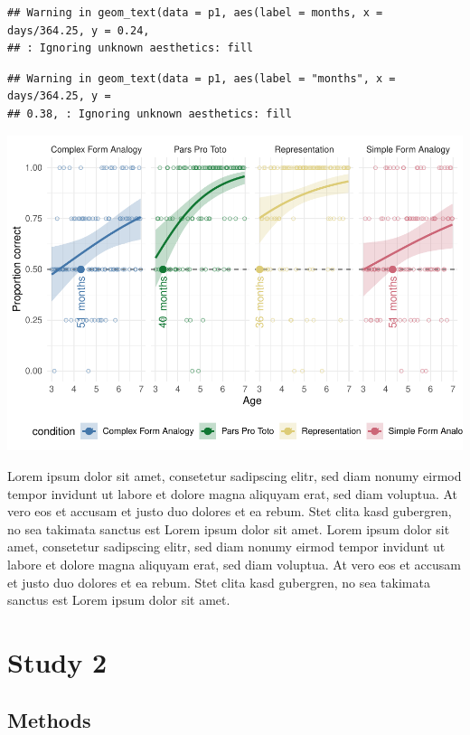 \documentclass[
  man]{apa6}
\begin{document}
\begin{verbatim}
## Warning in geom_text(data = p1, aes(label = months, x = days/364.25, y = 0.24,
## : Ignoring unknown aesthetics: fill
\end{verbatim}

\begin{verbatim}
## Warning in geom_text(data = p1, aes(label = "months", x = days/364.25, y =
## 0.38, : Ignoring unknown aesthetics: fill
\end{verbatim}

\includegraphics{symlit_rep_manuscript_files/figure-latex/S1_bayes_plot-1.pdf}

Lorem ipsum dolor sit amet, consetetur sadipscing elitr, sed diam nonumy eirmod tempor invidunt ut labore et dolore magna aliquyam erat, sed diam voluptua. At vero eos et accusam et justo duo dolores et ea rebum. Stet clita kasd gubergren, no sea takimata sanctus est Lorem ipsum dolor sit amet. Lorem ipsum dolor sit amet, consetetur sadipscing elitr, sed diam nonumy eirmod tempor invidunt ut labore et dolore magna aliquyam erat, sed diam voluptua. At vero eos et accusam et justo duo dolores et ea rebum. Stet clita kasd gubergren, no sea takimata sanctus est Lorem ipsum dolor sit amet.

\section{Study 2}\label{study-2}

\subsection{Methods}\label{methods-1}
\end{document}
